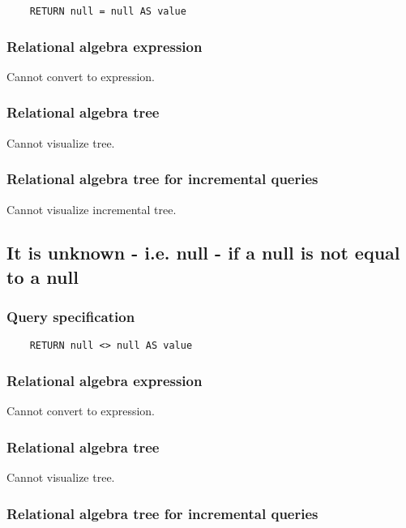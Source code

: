 	\begin{lstlisting}
	RETURN null = null AS value
	\end{lstlisting}


	\subsubsection*{Relational algebra expression}

	Cannot convert to expression.

	\subsubsection*{Relational algebra tree}

	Cannot visualize tree.

	\subsubsection*{Relational algebra tree for incremental queries}

	Cannot visualize incremental tree.
	\subsection{It is unknown - i.e. null - if a null is not equal to a null}

	\subsubsection*{Query specification}

	\begin{lstlisting}
	RETURN null <> null AS value
	\end{lstlisting}


	\subsubsection*{Relational algebra expression}

	Cannot convert to expression.

	\subsubsection*{Relational algebra tree}

	Cannot visualize tree.

	\subsubsection*{Relational algebra tree for incremental queries}

